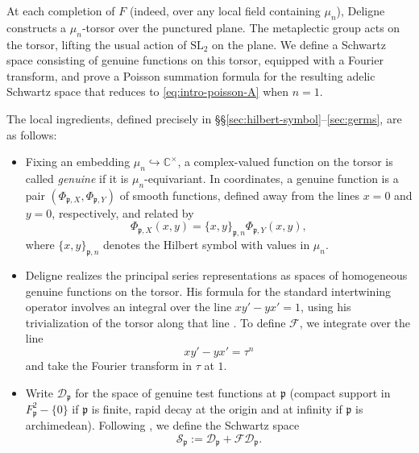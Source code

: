 \documentclass[reqno]{amsart}
\theoremstyle{plain}
\theoremstyle{definition}
\theoremstyle{itplain}
\numberwithin{equation}{section}
\numberwithin{theorem}{section}
\begin{document}
At each completion of $F$ (indeed, over any local field containing $\mu_n$), Deligne \cite[\S\S1, 3.7]{SB_1978-1979__21__244_0} constructs a $\mu_n$-torsor over the punctured plane.  The metaplectic group acts on the torsor, lifting the usual action of $\mathrm{SL}_2$ on the plane.  We define a Schwartz space consisting of genuine functions on this torsor, equipped with a Fourier transform, and prove a Poisson summation formula for the resulting adelic Schwartz space that reduces to \eqref{eq:intro-poisson-A} when $n = 1$.

The local ingredients, defined precisely in \S\S\ref{sec:hilbert-symbol}--\ref{sec:germs}, are as follows:
\begin{itemize}
\item Fixing an embedding $\mu_n \hookrightarrow \mathbb{C}^\times$, a complex-valued function on the torsor is called \emph{genuine} if it is $\mu_n$-equivariant.  In coordinates, a genuine function is a pair $(\Phi_{\mathfrak{p}, X}, \Phi_{\mathfrak{p}, Y})$ of smooth functions, defined away from the lines $x = 0$ and $y = 0$, respectively, and related by
  \begin{equation*}
    \Phi_{\mathfrak{p}, X}(x, y) = \{x, y\}_{\mathfrak{p}, n} \Phi_{\mathfrak{p}, Y}(x, y),
  \end{equation*}
  where $\{x, y\}_{\mathfrak{p}, n}$ denotes the Hilbert symbol with values in $\mu_n$.
\item Deligne \cite[\S6.1]{SB_1978-1979__21__244_0} realizes the principal series representations as spaces of homogeneous genuine functions on the torsor.  His formula for the standard intertwining operator \cite[\S6.3]{SB_1978-1979__21__244_0} involves an integral over the line $x y ' - y x ' = 1$, using his trivialization of the torsor along that line \cite[\S1.13]{SB_1978-1979__21__244_0}.  To define $\mathcal{F}$, we integrate over the line
  \begin{equation*}
    x y' - y x' = \tau^n
  \end{equation*}
  and take the Fourier transform in $\tau$ at $1$.
\item Write \(\mathcal D_{\mathfrak p}\) for the space of genuine test functions at \(\mathfrak p\) (compact support in $F_{\mathfrak{p}}^2 - \{0\}$ if $\mathfrak{p}$ is finite, rapid decay at the origin and at infinity if $\mathfrak{p}$ is archimedean).  Following \cite[\S3.1]{MR1694894}, we define the Schwartz space
  \begin{equation*}
    \mathcal S_{\mathfrak p} := \mathcal{D}_{\mathfrak{p}} + \mathcal{F} \mathcal{D}_{\mathfrak{p}}.

\end{equation*}
\end{itemize}
\end{document}
